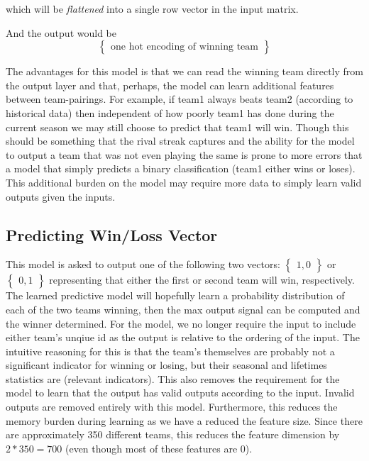 \documentclass{article} %
\begin{document}
which will be \textit{flattened} into a single row vector in the input matrix.

And the output would be
\[
\begin{Bmatrix}
  \text{one hot encoding of winning team}
\end{Bmatrix}
\]


The advantages for this model is that we can read the winning team directly from the output layer and that, perhaps, the model can learn additional features between team-pairings.  For example, if team1 always beats team2 (according to historical data) then independent of how poorly team1 has done during the current season we may still choose to predict that team1 will win.  Though this should be something that the rival streak captures and the ability for the model to output a team that was not even playing the same is prone to more errors that a model that simply predicts a binary classification (team1 either wins or loses).  This additional burden on the model may require more data to simply learn valid outputs given the inputs.

\subsection{Predicting Win/Loss Vector}
\label{sec:architectures-winloss-vector}

This model is asked to output one of the following two vectors: $\begin{Bmatrix} 1, 0 \end{Bmatrix}$ or $\begin{Bmatrix} 0, 1 \end{Bmatrix}$ representing that either the first or second team will win, respectively.  The learned predictive model will hopefully learn a probability distribution of each of the two teams winning, then the max output signal can be computed and the winner determined.  For the model, we no longer require the input to include either team's unqiue id as the output is relative to the ordering of the input.  The intuitive reasoning for this is that the team's themselves are probably not a significant indicator for winning or losing, but their seasonal and lifetimes statistics are (relevant indicators).  This also removes the requirement for the model to learn that the output has valid outputs according to the input.  Invalid outputs are removed entirely with this model.  Furthermore, this reduces the memory burden during learning as we have a reduced the feature size.  Since there are approximately 350 different teams, this reduces the feature dimension by $2 * 350 = 700$ (even though most of these features are 0).
\end{document}
